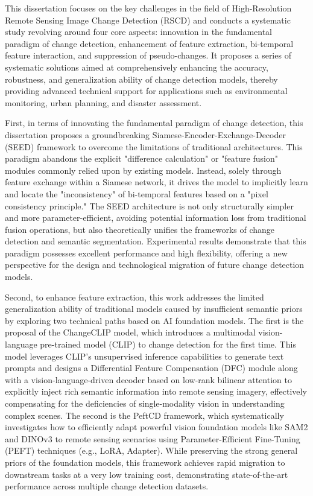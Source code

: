This dissertation focuses on the key challenges in the field of High-Resolution Remote Sensing Image Change Detection (RSCD) and conducts a systematic study revolving around four core aspects: innovation in the fundamental paradigm of change detection, enhancement of feature extraction, bi-temporal feature interaction, and suppression of pseudo-changes. It proposes a series of systematic solutions aimed at comprehensively enhancing the accuracy, robustness, and generalization ability of change detection models, thereby providing advanced technical support for applications such as environmental monitoring, urban planning, and disaster assessment.

First, in terms of innovating the fundamental paradigm of change detection, this dissertation proposes a groundbreaking Siamese-Encoder-Exchange-Decoder (SEED) framework to overcome the limitations of traditional architectures. This paradigm abandons the explicit "difference calculation" or "feature fusion" modules commonly relied upon by existing models. Instead, solely through feature exchange within a Siamese network, it drives the model to implicitly learn and locate the "inconsistency" of bi-temporal features based on a "pixel consistency principle." The SEED architecture is not only structurally simpler and more parameter-efficient, avoiding potential information loss from traditional fusion operations, but also theoretically unifies the frameworks of change detection and semantic segmentation. Experimental results demonstrate that this paradigm possesses excellent performance and high flexibility, offering a new perspective for the design and technological migration of future change detection models.

Second, to enhance feature extraction, this work addresses the limited generalization ability of traditional models caused by insufficient semantic priors by exploring two technical paths based on AI foundation models. The first is the proposal of the ChangeCLIP model, which introduces a multimodal vision-language pre-trained model (CLIP) to change detection for the first time. This model leverages CLIP's unsupervised inference capabilities to generate text prompts and designs a Differential Feature Compensation (DFC) module along with a vision-language-driven decoder based on low-rank bilinear attention to explicitly inject rich semantic information into remote sensing imagery, effectively compensating for the deficiencies of single-modality vision in understanding complex scenes. The second is the PeftCD framework, which systematically investigates how to efficiently adapt powerful vision foundation models like SAM2 and DINOv3 to remote sensing scenarios using Parameter-Efficient Fine-Tuning (PEFT) techniques (e.g., LoRA, Adapter). While preserving the strong general priors of the foundation models, this framework achieves rapid migration to downstream tasks at a very low training cost, demonstrating state-of-the-art performance across multiple change detection datasets.

